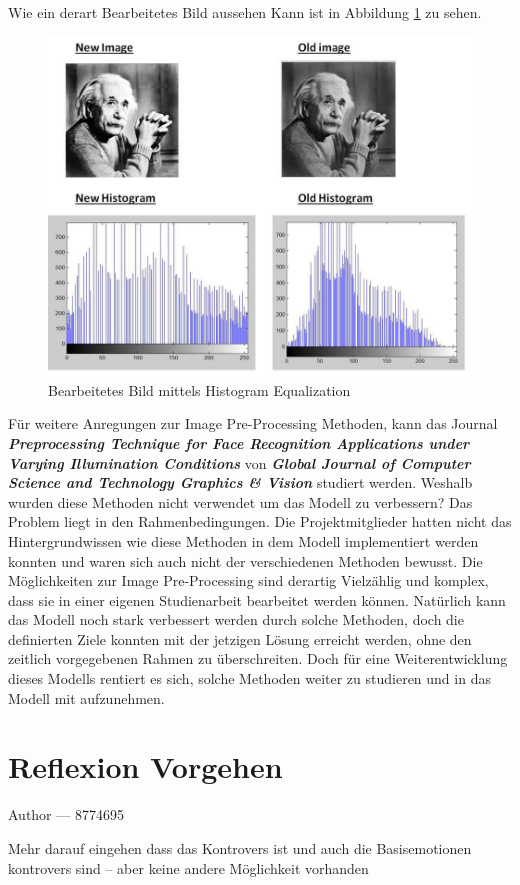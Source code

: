 \documentclass[12pt, a4paper]{report}
\makeatletter
\newcommand{\sectionauthor}[1]{%
  {\parindent0pt\vspace*{-5pt}%
  \large{Author --- }
  \linespread{1.1}\large\scshape#1%
  \par\nobreak\vspace*{35pt} }
  \@afterheading%
}
\makeatother
\begin{document}
Wie ein derart Bearbeitetes Bild aussehen Kann ist in Abbildung \ref{fig:Histogramm} zu sehen.
\begin{figure}[h]
\includegraphics[width=\linewidth]{Bilder/Histogramm}
\caption{Bearbeitetes Bild mittels Histogram Equalization}
\label{fig:Histogramm}
\end{figure}
Für weitere Anregungen zur Image Pre-Processing Methoden, kann das Journal \textbf{\textit{Preprocessing Technique for Face Recognition Applications under Varying Illumination Conditions}} von \textbf{\textit{Global Journal of Computer Science and Technology Graphics \& Vision}} studiert werden.
\newline
Weshalb wurden diese Methoden nicht verwendet um das Modell zu verbessern? Das Problem liegt in den Rahmenbedingungen. Die Projektmitglieder hatten nicht das Hintergrundwissen wie diese Methoden in dem Modell implementiert werden konnten und waren sich auch nicht der verschiedenen Methoden bewusst. Die Möglichkeiten zur Image Pre-Processing sind derartig Vielzählig und komplex, dass sie in einer eigenen Studienarbeit bearbeitet werden können. Natürlich kann das Modell noch stark verbessert werden durch solche Methoden, doch die definierten Ziele konnten mit der jetzigen Lösung erreicht werden, ohne den zeitlich vorgegebenen Rahmen zu überschreiten.
Doch für eine Weiterentwicklung dieses Modells rentiert es sich, solche Methoden weiter zu studieren und in das Modell mit aufzunehmen.

\section{Reflexion Vorgehen}
\sectionauthor{8774695}
Mehr darauf eingehen dass das Kontrovers ist und auch die Basisemotionen kontrovers sind --  aber keine andere Möglichkeit vorhanden 
\end{document}
